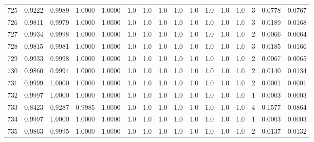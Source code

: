\begin{tabular}{lrrrrrrrrrrrrrrr}
725 &      0.9222 &  0.9989 &  1.0000 &  1.0000 &     1.0 &     1.0 &     1.0 &     1.0 &     1.0 &     1.0 &      1.0 &        1.0 &      3 &                    0.0778 &                     0.0767 \\
726 &      0.9811 &  0.9979 &  1.0000 &  1.0000 &     1.0 &     1.0 &     1.0 &     1.0 &     1.0 &     1.0 &      1.0 &        1.0 &      3 &                    0.0189 &                     0.0168 \\
727 &      0.9934 &  0.9998 &  1.0000 &  1.0000 &     1.0 &     1.0 &     1.0 &     1.0 &     1.0 &     1.0 &      1.0 &        1.0 &      2 &                    0.0066 &                     0.0064 \\
728 &      0.9815 &  0.9981 &  1.0000 &  1.0000 &     1.0 &     1.0 &     1.0 &     1.0 &     1.0 &     1.0 &      1.0 &        1.0 &      3 &                    0.0185 &                     0.0166 \\
729 &      0.9933 &  0.9998 &  1.0000 &  1.0000 &     1.0 &     1.0 &     1.0 &     1.0 &     1.0 &     1.0 &      1.0 &        1.0 &      2 &                    0.0067 &                     0.0065 \\
730 &      0.9860 &  0.9994 &  1.0000 &  1.0000 &     1.0 &     1.0 &     1.0 &     1.0 &     1.0 &     1.0 &      1.0 &        1.0 &      2 &                    0.0140 &                     0.0134 \\
731 &      0.9999 &  1.0000 &  1.0000 &  1.0000 &     1.0 &     1.0 &     1.0 &     1.0 &     1.0 &     1.0 &      1.0 &        1.0 &      2 &                    0.0001 &                     0.0001 \\
732 &      0.9997 &  1.0000 &  1.0000 &  1.0000 &     1.0 &     1.0 &     1.0 &     1.0 &     1.0 &     1.0 &      1.0 &        1.0 &      1 &                    0.0003 &                     0.0003 \\
733 &      0.8423 &  0.9287 &  0.9985 &  1.0000 &     1.0 &     1.0 &     1.0 &     1.0 &     1.0 &     1.0 &      1.0 &        1.0 &      4 &                    0.1577 &                     0.0864 \\
734 &      0.9997 &  1.0000 &  1.0000 &  1.0000 &     1.0 &     1.0 &     1.0 &     1.0 &     1.0 &     1.0 &      1.0 &        1.0 &      1 &                    0.0003 &                     0.0003 \\
735 &      0.9863 &  0.9995 &  1.0000 &  1.0000 &     1.0 &     1.0 &     1.0 &     1.0 &     1.0 &     1.0 &      1.0 &        1.0 &      2 &                    0.0137 &                     0.0132 \\

\end{tabular}
